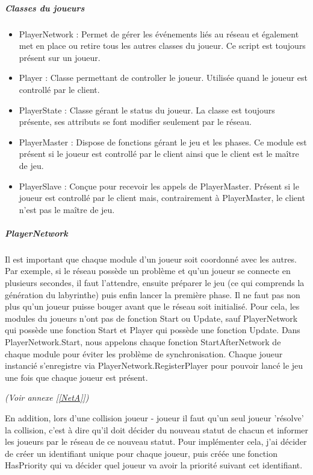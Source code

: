 \documentclass{article}
\begin{document}
\subparagraph{Classes du joueurs}

\begin{itemize}
\item PlayerNetwork : Permet de gérer les événements liés au réseau et également met en place ou retire tous les autres classes du joueur. Ce script est toujours présent sur un joueur.
\item Player : Classe permettant de controller le joueur. Utilisée quand le joueur est controllé par le client.
\item PlayerState : Classe gérant le status du joueur. La classe est toujours présente, ses attributs se font modifier seulement par le réseau.
\item PlayerMaster : Dispose de fonctions gérant le jeu et les phases. Ce module est présent si le joueur est controllé par le client ainsi que le client est le maître de jeu.
\item PlayerSlave : Conçue pour recevoir les appels de PlayerMaster. Présent si le joueur est controllé par le client mais, contrairement à PlayerMaster, le client n'est pas le maître de jeu.
\end{itemize}

\subparagraph{PlayerNetwork}

Il est important que chaque module d'un joueur soit coordonné avec les autres. Par exemple, si le réseau possède un problème et qu'un joueur se connecte en plusieurs secondes, il faut l'attendre, ensuite préparer le jeu (ce qui comprends la génération du labyrinthe) puis enfin lancer la première phase. Il ne faut pas non plus qu'un joueur puisse bouger avant que le réseau soit initialisé.
Pour cela, les modules du joueurs n'ont pas de fonction Start ou Update, sauf PlayerNetwork qui possède une fonction Start et Player qui possède une fonction Update. Dans PlayerNetwork.Start, nous appelons chaque fonction StartAfterNetwork de chaque module pour éviter les problème de synchronisation.
Chaque joueur instancié s'enregistre via PlayerNetwork.RegisterPlayer pour pouvoir lancé le jeu une fois que chaque joueur est présent.

\emph{(Voir annexe [\ref{NetA}])}


En addition, lors d'une collision joueur - joueur il faut qu'un seul joueur 'résolve' la collision, c'est à dire qu'il doit décider du nouveau statut de chacun et informer les joueurs par le réseau de ce nouveau statut.
Pour implémenter cela, j'ai décider de créer un identifiant unique pour chaque joueur, puis créée une fonction HasPriority qui va décider quel joueur va avoir la priorité suivant cet identifiant.
\end{document}
